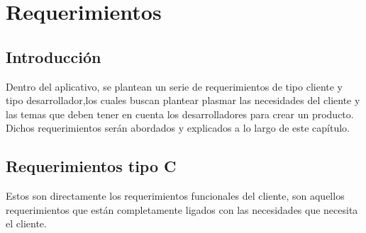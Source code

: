 \chapter{Requerimientos}
\section{Introducción}
Dentro del aplicativo, se plantean un serie de requerimientos de tipo cliente y tipo desarrollador,los cuales buscan plantear plasmar las necesidades del cliente y las temas que deben tener en cuenta los desarrolladores para crear un producto. Dichos requerimientos serán abordados y explicados a lo largo de este capítulo.
\section{Requerimientos tipo C}
Estos son directamente los requerimientos funcionales del cliente, son aquellos requerimientos que están completamente ligados con las necesidades que necesita el cliente.

